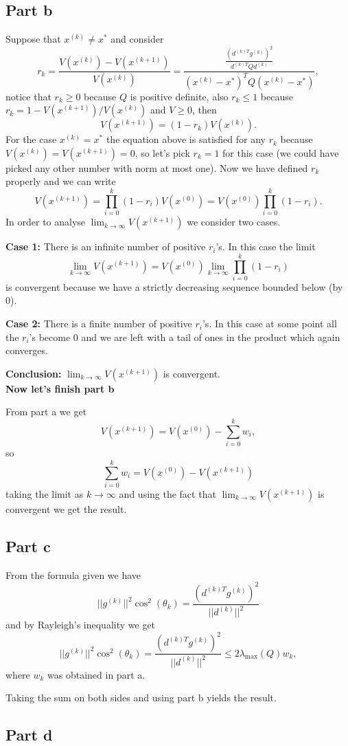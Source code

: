 \documentclass{article}
\begin{document}
\subsection*{Part b}
Suppose that $x^{(k)}\neq x^*$ and consider
\[
r_k=\frac{V(x^{(k)}) -V(x^{(k+1)})}{V(x^{(k)})}
=\frac{\frac{\left(d^{(k)T}g^{(k)}\right)^2}{d^{(k)T}Qd^{(k)}}}{(x^{(k)}-x^*)^TQ(x^{(k)}-x^*)},
\]
notice that $r_k\geq0$ because $Q$ is positive definite, also $r_k\leq 1$ because\\
$r_k=1-V(x^{(k+1)})/V(x^{(k)})$ and $V\geq 0$, then
\[
V(x^{(k+1)})=(1-r_k)V(x^{(k)}).
\]
For the case $x^{(k)}=x^*$ the equation above is satisfied for any $r_k$
because $V(x^{(k)})=V(x^{(k+1)})=0$, so let's pick $r_k=1$ for this case (we
could have picked any other number with norm at most one). Now we have defined
$r_k$ properly and we can write
\[
V(x^{(k+1)})=\prod_{i=0}^k(1-r_i)V(x^{(0)})=V(x^{(0)})\prod_{i=0}^k(1-r_i).
\]
In order to analyse $\lim_{k\to\infty}V(x^{(k+1)})$ we consider two cases.

\textbf{Case 1:} There is an infinite number of positive $r_i$'s. In this case
the limit
\[
	\lim_{k\to\infty}V(x^{(k+1)})=V(x^{(0)})\lim_{k\to\infty}\prod_{i=0}^k(1-r_i)
\]
is convergent because we have a strictly decreasing sequence bounded below (by
0).

\textbf{Case 2:} There is a finite number of positive $r_i$'s. In this case at
some point all the $r_i$'s become 0 and we are left with a tail of ones in the
product which again converges.

\textbf{Conclusion:} $\lim_{k\to\infty}V(x^{(k+1)})$ is convergent.\\
\textbf{Now let's finish part b}

From part a we get
\[
V(x^{(k+1)})=V(x^{(0)})-\sum_{i=0}^kw_i,
\]
so
\[
\sum_{i=0}^kw_i=V(x^{(0)})-V(x^{(k+1)})
\]
taking the limit as $k\to\infty$ and using the fact that
$\lim_{k\to\infty}V(x^{(k+1)})$ is convergent we get the result.
\subsection*{Part c}
From the formula given we have
\[
||g^{(k)}||^2\cos^2(\theta_k)=\frac{(d^{(k)T}g^{(k)})^2}{||d^{(k)}||^2}
\]
and by Rayleigh's inequality we get
\[
||g^{(k)}||^2\cos^2(\theta_k)=\frac{(d^{(k)T}g^{(k)})^2}{||d^{(k)}||^2}
\leq2\lambda_{\max}(Q)w_k,
\]
where $w_k$ was obtained in part a.

Taking the sum on both sides and using part b yields the result.
\subsection*{Part d}
\end{document}
